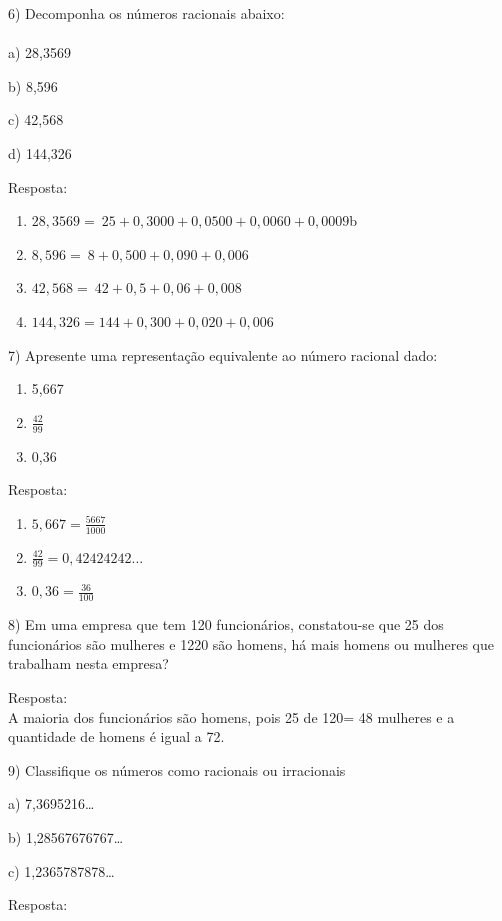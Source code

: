 6) Decomponha os números racionais abaixo:\\
~\\
a) 28,3569

b) 8,596

c) 42,568

d) 144,326

Resposta:

\begin{enumerate}
\def\labelenumi{\alph{enumi})}
\item
  \(28,3569 = \ 25 + 0,3000 + 0,0500 + 0,0060 + 0,0009\)b
\item
  \(8,596 = \ 8 + 0,500 + 0,090 + 0,006\)
\item
  \(42,568 = \ 42 + 0,5 + 0,06 + 0,008\)
\item
  \(144,326 = 144 + 0,300 + 0,020 + 0,006\)
\end{enumerate}

7) Apresente uma representação equivalente ao número racional dado:

\begin{enumerate}
\def\labelenumi{\alph{enumi})}
\item
  5,667
\item
  \(\frac{42}{99}\)
\item
  0,36
\end{enumerate}

Resposta:~~~~~~~~

\begin{enumerate}
\def\labelenumi{\alph{enumi})}
\item
  \(5,667 = \frac{5667}{1000}\)
\item
  \(\frac{42}{99} = 0,42424242...\)
\item
  \(0,36 = \frac{36}{100}\)
\end{enumerate}

8) Em uma empresa que tem 120 funcionários, constatou-se que 25 dos
funcionários são mulheres e 1220 são homens, há mais homens ou mulheres
que trabalham nesta empresa?~

Resposta:\\
A maioria dos funcionários são homens, pois 25 de 120= 48 mulheres e a
quantidade de homens é igual a 72.

9) Classifique os números como racionais ou irracionais

a) 7,3695216\ldots{}

b) 1,28567676767\ldots{}

c) 1,2365787878\ldots{}

Resposta:

